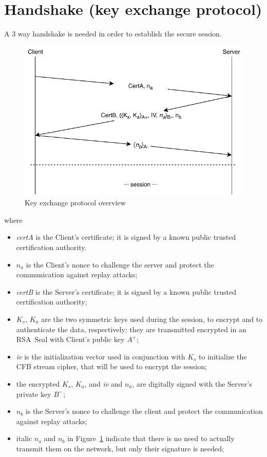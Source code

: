 \documentclass[a4paper,12pt]{article}
\begin{document}
\section{Handshake (key exchange protocol)}
A 3 way handshake is needed in order to establish the secure session.

\begin{figure}[H]
\centering
\includegraphics{img/key-exchange-protocol.pdf}
\caption{Key exchange protocol overview}
\label{img:key-exchange-protocol}
\end{figure}

where

\begin{itemize}
  \item \emph{certA} is the Client's certificate; it is signed by a known public trusted certification authority.
  \item $n_a$ is the Client's nonce to challenge the server and protect the communication against replay attacks;
  \item \emph{certB} is the Server's certificate; it is signed by a known public trusted certification authority;
  \item $K_s$, $K_a$ are the two symmetric keys used during the session, to encrypt and to authenticate the data, respectively; they are transmitted encrypted in an RSA~Seal with Client's public key $A^{+}$;
  \item \emph{iv} is the initialization vector used in conjunction with $K_s$ to initialize the CFB stream cipher, that will be used to encrypt the session;
  \item the encrypted $K_s$, $K_a$, and \emph{iv} and $n_a$, are digitally signed with the Server's private key $B^{-}$;
  \item $n_b$ is the Server's nonce to challenge the client and protect the communication against replay attacks;
  \item italic $n_a$ and $n_b$ in Figure~\ref{img:key-exchange-protocol} indicate that there is no need to actually transmit them on the network, but only their signature is needed;
\end{itemize}
\end{document}
